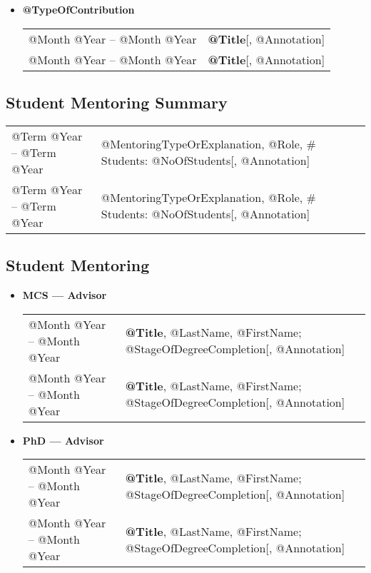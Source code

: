 \documentclass[10pt]{article}
\begin{document}
\begin{IOWA ONLY}
\begin{itemize}
\item[] \textbf{@TypeOfContribution}
\\[1.3ex]
\begin{tabular}{l@{\quad\ }p{35em}} 
 @Month @Year -- @Month @Year
 & {\bf @Title}[, @Annotation]
 \\[.5ex]
 @Month @Year -- @Month @Year
 & {\bf @Title}[, @Annotation]
 \\[.5ex]
\end{tabular}
\end{itemize}


\subsection*{Student Mentoring Summary}
\smallskip

\begin{tabular}{l@{\quad\ }p{35em}} 
 @Term @Year -- @Term @Year
 & @MentoringTypeOrExplanation, @Role, \# Students: @NoOfStudents[, @Annotation]
 \\[.5ex]
 @Term @Year -- @Term @Year
 & @MentoringTypeOrExplanation, @Role, \# Students: @NoOfStudents[, @Annotation]
 \\[.5ex]
\end{tabular}

\subsection*{Student Mentoring}
\smallskip

\begin{itemize}
\item[] \textbf{MCS --- Advisor}
\\[1.3ex]
\begin{tabular}{l@{\quad\ }p{30em}} 
 @Month @Year -- @Month @Year
 & {\bf @Title}, @LastName, @FirstName; @StageOfDegreeCompletion[, @Annotation]
 \\[.5ex]
 @Month @Year -- @Month @Year
 & {\bf @Title}, @LastName, @FirstName; @StageOfDegreeCompletion[, @Annotation]
 \\[.5ex]
\end{tabular}

\item[] \textbf{PhD --- Advisor}
\\[1.3ex]
\begin{tabular}{l@{\quad\ }p{30em}} 
 @Month @Year -- @Month @Year
 & {\bf @Title}, @LastName, @FirstName; @StageOfDegreeCompletion[, @Annotation]
 \\[.5ex]
 @Month @Year -- @Month @Year
 & {\bf @Title}, @LastName, @FirstName; @StageOfDegreeCompletion[, @Annotation]
 \\[.5ex]
\end{tabular}


\end{itemize}
\end{IOWA ONLY}
\end{document}
